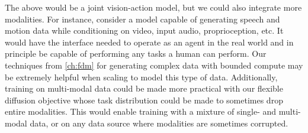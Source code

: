 The above would be a joint vision-action model, but we could also integrate more modalities. For instance, consider a model capable of generating speech and motion data while conditioning on video, input audio, proprioception, etc. It would have the interface needed to operate as an agent in the real world and in principle be capable of performing any tasks a human can perform. Our techniques from \cref{ch:fdm} for generating complex data with bounded compute may be extremely helpful when scaling to model this type of data. Additionally, training on multi-modal data could be made more practical with our flexible diffusion objective whose task distribution could be made to sometimes drop entire modalities. This would enable training with a mixture of single- and multi-modal data, or on any data source where modalities are sometimes corrupted.






